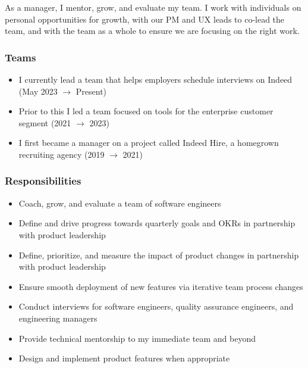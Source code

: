 \documentclass[11pt]{amsart}
\begin{document}
% 
%
\begin{tcolorbox}[
	title=Software Engineering Manager \textcolor{DarkGray}{/} Indeed,
	after title={\hfill2019 \textcolor{DarkGray}{$\rightarrow$} Present \textcolor{DarkGray}{(5 years)}}
]

As a manager, I mentor, grow, and evaluate my team. I work with individuals on personal opportunities for growth, with our PM and UX leads to co-lead the team, and with the team as a whole to ensure we are focusing on the right work.

\subsubsection{Teams}

\begin{itemize}[noitemsep, leftmargin=2em, label=\raisebox{0.25ex}{\tiny$\bullet$}]
	\item I currently lead a team that helps employers schedule interviews on Indeed (May 2023 {$\rightarrow$} Present)
	\item Prior to this I led a team focused on tools for the enterprise customer segment (2021 {$\rightarrow$} 2023)
	\item I first became a manager on a project called Indeed Hire, a homegrown recruiting agency (2019 {$\rightarrow$} 2021)
\end{itemize}

\subsubsection{Responsibilities}

\begin{itemize}[noitemsep, leftmargin=2em, label=\raisebox{0.25ex}{\tiny$\bullet$}]
	\item Coach, grow, and evaluate a team of software engineers
	\item Define and drive progress towards quarterly goals and \textsc{OKR}s in partnership with product leadership
	\item Define, prioritize, and measure the impact of product changes in partnership with product leadership
	\item Ensure smooth deployment of new features via iterative team process changes
	\item Conduct interviews for software engineers, quality assurance engineers, and engineering managers
	\item Provide technical mentorship to my immediate team and beyond
	\item Design and implement product features when appropriate
\end{itemize}


\end{tcolorbox}
\end{document}
